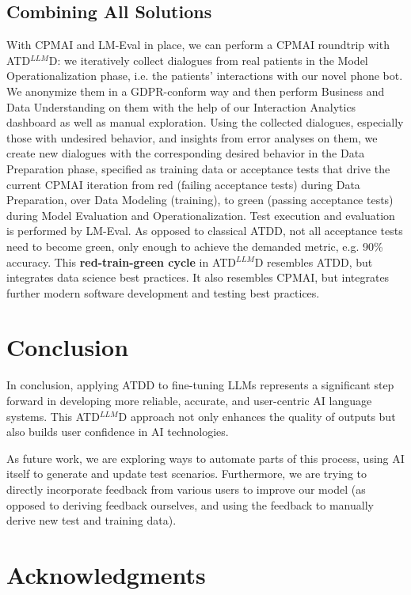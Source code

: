 \documentclass[twocolumn]{article}
\newcommand{\ATDLLMD}{ATD$^{LLM}$D}%
\begin{document}
\subsection{Combining All Solutions}

With CPMAI and LM-Eval in place, we can perform a CPMAI roundtrip with \ATDLLMD{}: we iteratively collect dialogues from real patients in the Model Operationalization phase, i.e. the patients’ interactions with our novel phone bot. We anonymize them in a GDPR-conform way and then perform Business and Data Understanding on them with the help of our Interaction Analytics dashboard as well as manual exploration. Using the collected dialogues, especially those with undesired behavior, and insights from error analyses on them, we create new dialogues with the corresponding desired behavior in the Data Preparation phase, specified as training data or acceptance tests that drive the current CPMAI iteration from red (failing acceptance tests) during Data Preparation, over Data Modeling (training), to green (passing acceptance tests) during Model Evaluation and Operationalization. Test execution and evaluation is performed by LM-Eval. As opposed to classical ATDD, not all acceptance tests need to become green, only enough to achieve the demanded metric, e.g. 90\% accuracy. This {\bfseries red-train-green cycle} in \ATDLLMD{} resembles ATDD, but integrates data science best practices. It also resembles CPMAI, but integrates further modern software development and testing best practices.


\section{Conclusion}

In conclusion, applying ATDD to fine-tuning LLMs represents a significant step forward in developing more reliable, accurate, and user-centric AI language systems. This \ATDLLMD{} approach not only enhances the quality of outputs but also builds user confidence in AI technologies.

As future work, we are exploring ways to automate parts of this process, using AI itself to generate and update test scenarios. Furthermore, we are trying to directly incorporate feedback from various users to improve our model (as opposed to deriving feedback ourselves, and using the feedback to manually derive new test and training data).


\section{Acknowledgments}
\end{document}
